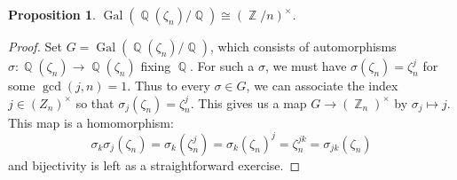 \documentclass[11pt, a4paper]{memoir}
\DeclareMathOperator{\Q}{{\mathbb{Q}}}
\DeclareMathOperator{\Z}{{\mathbb{Z}}}
\theoremstyle{change}
\newtheorem{proposition}[theorem]{Proposition}
\theoremstyle{plain}
\theoremstyle{nonumberplain}
\newtheorem{proof}{Proof}
\DeclareMathOperator{\Gal}{Gal}
\begin{document}
\begin{proposition}
    $\Gal(\Q(\zeta_n)/\Q)\cong(\Z/n)^\times$.
\end{proposition}
\begin{proof}
    Set $G=\Gal(\Q(\zeta_n)/\Q)$, which consists of automorphisms $\sigma:\Q(\zeta_n)\to\Q(\zeta_n)$ fixing $\Q$.
    For such a $\sigma$, we must have $\sigma(\zeta_n)=\zeta_n^j$ for some $\gcd(j,n)=1$.
    Thus to every $\sigma\in G$, we can associate the index $j\in(Z_n)^\times$ so that $\sigma_j(\zeta_n)=\zeta_n^j$.
    This gives us a map $G\to(\Z_n)^\times$ by $\sigma_j\mapsto j$.
    This map is a homomorphism:
    \begin{equation*}
        \sigma_k\sigma_j(\zeta_n)=\sigma_k(\zeta_n^j)=\sigma_k(\zeta_n)^j=\zeta_n^{jk}=\sigma_{jk}(\zeta_n)
    \end{equation*}
    and bijectivity is left as a straightforward exercise.
\end{proof}
\end{document}
